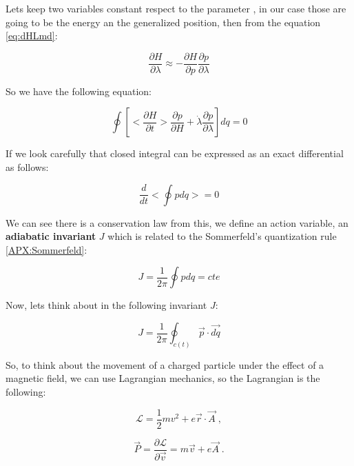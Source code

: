 \documentclass[spanish,notitlepage,letterpaper,11pt]{article} %
\numberwithin{equation}{subsection}
\begin{document}
    Lets keep two variables constant respect to the parameter $\label{}$, in our case those are going to be the energy an the generalized position, then from the equation \ref{eq:dHLmd}:

    \begin{equation}
        \frac{\partial H}{\partial \lambda} \approx - \frac{\partial H}{\partial p} \frac{\partial p}{\partial \lambda}
    \end{equation}

    So we have the following equation:

    \begin{equation}
        \oint \left[<\frac{\partial H}{\partial t}>\frac{\partial p}{\partial H} + \Dot{\lambda}\frac{\partial p}{\partial \lambda} \right]dq = 0
    \end{equation}

    If we look carefully that closed integral can be expressed as an exact differential as follows:

    \begin{equation}
        \frac{d}{dt}<\oint pdq> = 0
    \end{equation}

    We can see there is a conservation law from this, we define an action variable, an \textbf{adiabatic invariant} $J$ which is related to the Sommerfeld's quantization rule \ref{APX:Sommerfeld}:

    \begin{equation}
        J = \frac{1}{2\pi}\oint pdq = cte
    \end{equation}

    Now, lets think about in the following invariant $J$:

    \begin{equation}\label{eq:InvAdiaba}
        J = \frac{1}{2\pi}\oint_{c(t)}\Vec{p}\cdot \Vec{dq}
    \end{equation}

    So, to think about the movement of a charged particle under the effect of a magnetic field, we can use Lagrangian mechanics, so the Lagrangian is the following:

    \begin{equation}
        \mathcal{L} = \frac{1}{2}mv^2 + e \Vec{r}\cdot\Vec{A} \;,
    \end{equation}

    \begin{equation}
        \Vec{P} = \frac{\partial \mathcal{L}}{\partial \Vec{v}} = m\Vec{v} +e \Vec{A}\;.
    \end{equation}
\end{document}
